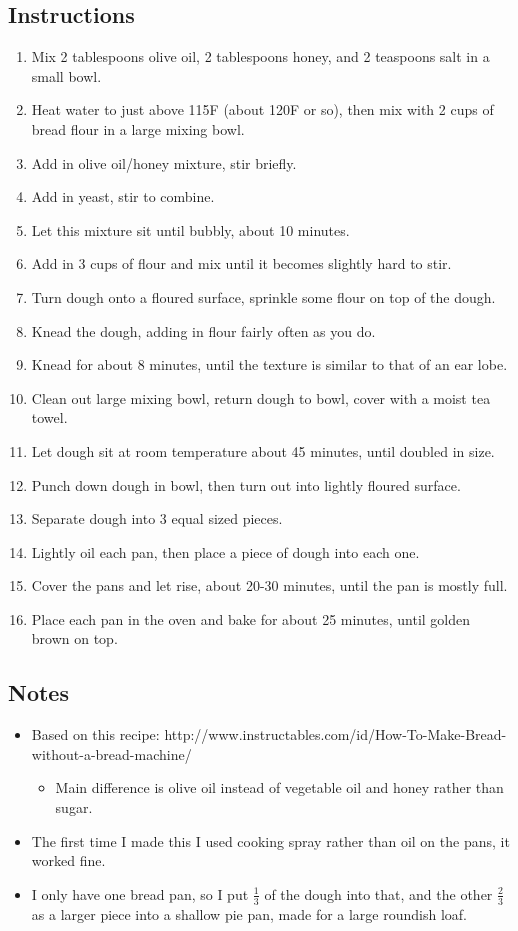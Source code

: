 \begin{multicols}{2}
\subsection*{Instructions}
\begin{enumerate}
    \item Mix 2 tablespoons olive oil, 2 tablespoons honey, and 2 teaspoons salt in a small bowl.
    \item Heat water to just above 115F (about 120F or so), then mix with 2 cups of bread flour in a large mixing bowl.
    \item Add in olive oil/honey mixture, stir briefly.
    \item Add in yeast, stir to combine.
    \item Let this mixture sit until bubbly, about 10 minutes.
    \item Add in 3 cups of flour and mix until it becomes slightly hard to stir.
    \item Turn dough onto a floured surface, sprinkle some flour on top of the dough.
    \item Knead the dough, adding in flour fairly often as you do.
    \item Knead for about 8 minutes, until the texture is similar to that of an ear lobe.
    \item Clean out large mixing bowl, return dough to bowl, cover with a moist tea towel.
    \item Let dough sit at room temperature about 45 minutes, until doubled in size.
    \item Punch down dough in bowl, then turn out into lightly floured surface.
    \item Separate dough into 3 equal sized pieces.
    \item Lightly oil each pan, then place a piece of dough into each one.
    \item Cover the pans and let rise, about 20-30 minutes, until the pan is mostly full.
    \item Place each pan in the oven and bake for about 25 minutes, until golden brown on top.
\end{enumerate}

\subsection*{Notes}
\begin{itemize}
    \item Based on this recipe: http://www.instructables.com/id/How-To-Make-Bread-without-a-bread-machine/ 
    \begin{itemize}
        \item Main difference is olive oil instead of vegetable oil and honey rather than sugar.
    \end{itemize}
    \item The first time I made this I used cooking spray rather than oil on the pans, it worked fine.
    \item I only have one bread pan, so I put \( \frac{1}{3} \) of the dough into that, and the other \( \frac{2}{3} \) as a larger piece into a shallow pie pan, made for a large roundish loaf.
\end{itemize}
\end{multicols}
\clearpage